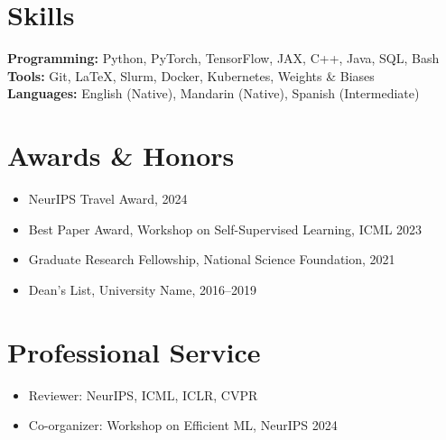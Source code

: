 \documentclass[11pt,a4paper]{article}
\begin{document}
\section{Skills}

\textbf{Programming:} Python, PyTorch, TensorFlow, JAX, C++, Java, SQL, Bash\\
\textbf{Tools:} Git, LaTeX, Slurm, Docker, Kubernetes, Weights \& Biases\\
\textbf{Languages:} English (Native), Mandarin (Native), Spanish (Intermediate)

\section{Awards \& Honors}

\begin{itemize}[leftmargin=*, itemsep=2pt]
  \item NeurIPS Travel Award, 2024
  \item Best Paper Award, Workshop on Self-Supervised Learning, ICML 2023
  \item Graduate Research Fellowship, National Science Foundation, 2021
  \item Dean's List, University Name, 2016--2019
\end{itemize}

\section{Professional Service}

\begin{itemize}[leftmargin=*, itemsep=2pt]
  \item Reviewer: NeurIPS, ICML, ICLR, CVPR
  \item Co-organizer: Workshop on Efficient ML, NeurIPS 2024
\end{itemize}
\end{document}

